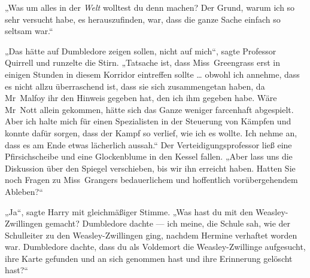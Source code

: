 „Was um alles in der \emph{Welt} wolltest du denn machen? Der Grund, warum ich so sehr versucht habe, es herauszufinden, war, dass die ganze Sache einfach so seltsam war.“

„Das hätte auf Dumbledore zeigen sollen, nicht auf mich“, sagte Professor Quirrell und runzelte die Stirn.
„Tatsache ist, dass Miss~Greengrass erst in einigen Stunden in diesem Korridor eintreffen sollte … obwohl ich annehme, dass es nicht allzu überraschend ist, dass sie sich zusammengetan haben, da Mr~Malfoy ihr den Hinweis gegeben hat, den ich ihm gegeben habe. Wäre Mr~Nott allein gekommen, hätte sich das Ganze weniger farcenhaft abgespielt. Aber ich halte mich für einen Spezialisten in der Steuerung von Kämpfen und konnte dafür sorgen, dass der Kampf so verlief, wie ich es wollte. Ich nehme an, dass es am Ende etwas lächerlich aussah.“
Der Verteidigungsprofessor ließ eine Pfirsichscheibe und eine Glockenblume in den Kessel fallen.
„Aber lass uns die Diskussion über den Spiegel verschieben, bis wir ihn erreicht haben. Hatten Sie noch Fragen zu Miss~Grangers bedauerlichem und hoffentlich vorübergehendem Ableben?“

„Ja“, sagte Harry mit gleichmäßiger Stimme.
„Was hast du mit den Weasley-Zwillingen gemacht? Dumbledore dachte — ich meine, die Schule sah, wie der Schulleiter zu den Weasley-Zwillingen ging, nachdem Hermine verhaftet worden war. Dumbledore dachte, dass du als Voldemort die Weasley-Zwillinge aufgesucht, ihre Karte gefunden und an sich genommen hast und ihre Erinnerung gelöscht hast?“

